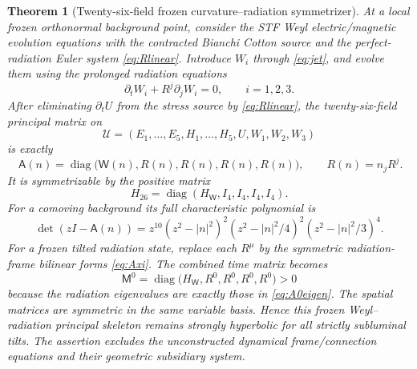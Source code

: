 \documentclass[11pt,a4paper]{article}
\newtheorem{theorem}{Theorem}
\begin{document}
\begin{theorem}[Twenty-six-field frozen
curvature--radiation symmetrizer]
\label{thm:26}
At a local frozen orthonormal
background point, consider the
STF Weyl electric/magnetic
evolution equations with the
contracted Bianchi Cotton source
and the perfect-radiation Euler
system \eqref{eq:Rlinear}.
Introduce $W_i$ through
\eqref{eq:jet}, and evolve them
using the \emph{prolonged}
radiation equations
\begin{equation}\label{eq:prolong}
\partial_tW_i+R^j\partial_jW_i=0,
\qquad i=1,2,3 .
\end{equation}
After eliminating $\partial_t U$
from the stress source by
\eqref{eq:Rlinear}, the
twenty-six-field principal
matrix on
\[
\mathcal U=(E_1,\ldots,E_5,
H_1,\ldots,H_5,U,W_1,W_2,W_3)
\]
is \emph{exactly}
\begin{equation}\label{eq:A26}
\boxed{\quad
\mathsf A(n)=
\operatorname{diag}\bigl(
\mathsf W(n),R(n),R(n),R(n),R(n)
\bigr),\qquad R(n)=n_jR^j.
\quad}
\end{equation}
It is symmetrizable by the
positive matrix
\begin{equation}\label{eq:H26}
H_{26}=
\operatorname{diag}
(H_{\mathsf W},I_4,I_4,I_4,I_4).
\end{equation}
For a comoving background its
full characteristic polynomial is
\begin{equation}\label{eq:poly26}
\det(zI-\mathsf A(n))
=z^{10}(z^2-|n|^2)^2
(z^2-|n|^2/4)^2
(z^2-|n|^2/3)^4.
\end{equation}
For a frozen \emph{tilted}
radiation state, replace each
$R^\mu$ by the symmetric
radiation-frame bilinear forms
\eqref{eq:Axi}. The combined
time matrix becomes
\[
\mathsf M^0=
\operatorname{diag}\bigl(
H_{\mathsf W},
R^0,R^0,R^0,R^0
\bigr)>0
\]
because the radiation eigenvalues
are exactly those in
\eqref{eq:A0eigen}.
The spatial matrices are symmetric
in the same variable basis. Hence
this \emph{frozen Weyl--radiation
principal skeleton} remains
strongly hyperbolic for all
strictly subluminal tilts.
The assertion excludes the
unconstructed dynamical
frame/connection equations and
their geometric subsidiary system.
\end{theorem}
\end{document}
